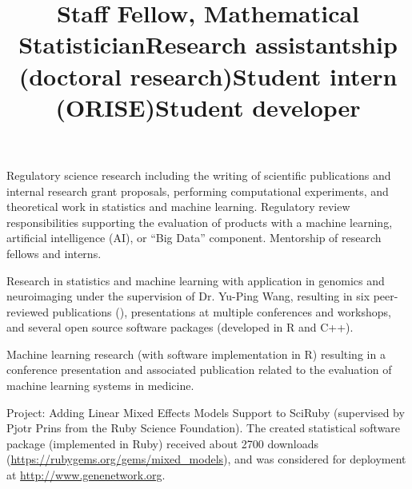 \documentclass[overlapped, line, 10pt]{res} %
\begin{document}
\begin{resume}
\title{Staff Fellow, Mathematical Statistician}
\begin{position}
  Regulatory science research including the writing of scientific publications and internal research grant proposals, performing computational experiments, and theoretical work in statistics and machine learning.
  Regulatory review responsibilities supporting the evaluation of products with a machine learning, artificial intelligence (AI), or ``Big Data'' component.
  Mentorship of research fellows and interns.
\end{position}

\title{Research assistantship (doctoral research)}
\begin{position}
  Research in statistics and machine learning with application in genomics and neuroimaging under the supervision of Dr. Yu-Ping Wang, resulting in six peer-reviewed publications (\cite{gossmann2015, cao2015BCB, cao2015bioinformatics, Gossmann2017-yu, Gossmann2017-ln, brzyski2016}), presentations at multiple conferences and workshops, and several open source software packages (developed in R and C++).
\end{position}

\title{Student intern (ORISE)}
\begin{position}
  Machine learning research (with software implementation in R) resulting in a conference presentation and associated publication \cite{gossmann2018} related to the evaluation of machine learning systems in medicine.
\end{position}

\title{Student developer}
\begin{position}
  Project: Adding Linear Mixed Effects Models Support to SciRuby (supervised by Pjotr Prins from the Ruby Science Foundation). The created statistical software package (implemented in Ruby) received about 2700 downloads (\url{https://rubygems.org/gems/mixed_models}), and was considered for deployment at \url{http://www.genenetwork.org}.
\end{position}


\end{resume}
\end{document}
